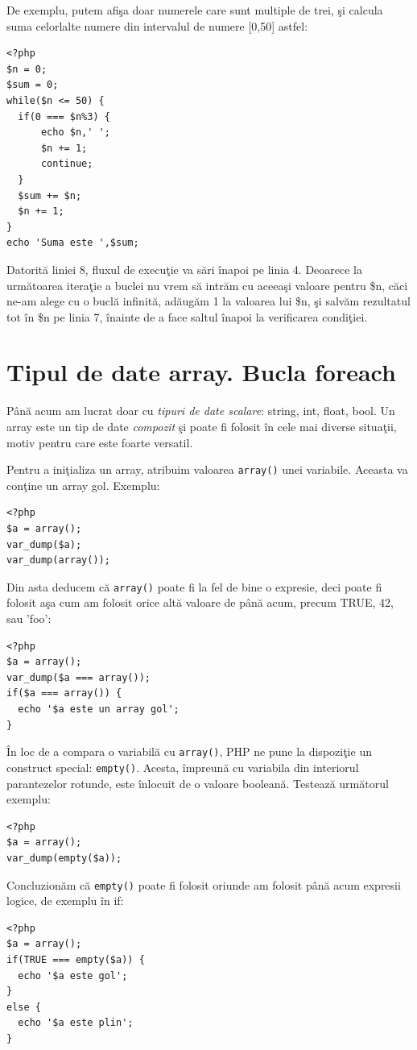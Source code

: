 De exemplu, putem afişa doar numerele care sunt multiple
de trei, şi calcula suma celorlalte numere din intervalul
de numere [0,50] astfel:
\begin{lstlisting}
<?php
$n = 0;
$sum = 0;
while($n <= 50) {
  if(0 === $n%3) {
	  echo $n,' ';
	  $n += 1;
	  continue;
  }
  $sum += $n;
  $n += 1;
}
echo 'Suma este ',$sum;
\end{lstlisting}
Datorită liniei 8, fluxul de execuţie va sări înapoi pe linia 4.
Deoarece la următoarea iteraţie a buclei nu vrem să intrăm cu aceeaşi valoare pentru \$n,
căci ne-am alege cu o buclă infinită, adăugăm 1 la valoarea lui \$n, şi
salvăm rezultatul tot în \$n pe linia 7, înainte de a face saltul înapoi la verificarea
condiţiei.
 

\section{Tipul de date array. Bucla foreach}
Până acum am lucrat doar cu \textsl{tipuri de date scalare}: string, int, float, bool.
Un array este un tip de date \textsl{compozit} şi poate fi folosit în cele mai
diverse situaţii, motiv pentru care este foarte versatil.

Pentru a iniţializa un array, atribuim valoarea \texttt{array()} unei variabile.
Aceasta va conţine un array gol. Exemplu:
\begin{lstlisting}
<?php
$a = array();
var_dump($a);
var_dump(array());
\end{lstlisting}
Din asta deducem că \texttt{array()} poate fi la fel de bine o expresie,
deci poate fi folosit aşa cum am folosit orice altă valoare de până acum,
precum TRUE, 42, sau 'foo':
\begin{lstlisting}
<?php
$a = array();
var_dump($a === array());
if($a === array()) {
  echo '$a este un array gol';
}
\end{lstlisting}

În loc de a compara o variabilă cu \texttt{array()}, PHP
ne pune la dispoziţie un construct special: \texttt{empty()}.
Acesta, împreună cu variabila din interiorul parantezelor
rotunde, este înlocuit de o valoare booleană. Testează
următorul exemplu:
\begin{lstlisting}
<?php
$a = array();
var_dump(empty($a));
\end{lstlisting}
Concluzionăm că \texttt{empty()} poate fi folosit oriunde
am folosit până acum expresii logice, de exemplu în if:

\begin{lstlisting}
<?php
$a = array();
if(TRUE === empty($a)) {
  echo '$a este gol';
}
else {
  echo '$a este plin';
}
\end{lstlisting}

